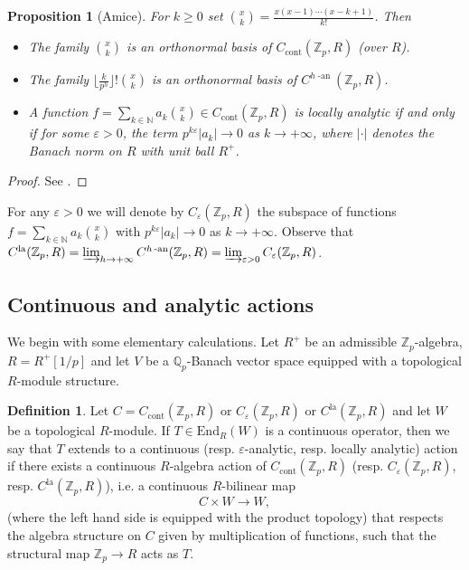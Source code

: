 \documentclass[10pt, oneside]{amsart}
\numberwithin{equation}{subsection}
\newtheorem{prop}[equation]{Proposition}
\theoremstyle{definition}
\newtheorem{definition}[equation]{Definition}
\theoremstyle{remark}
\newcommand{\mbb}[1]{\mathbb{#1}}
\newcommand{\opn}[1]{\operatorname{#1}}
\def\Q{\mathbb{Q}}
\def\Z{{\mathbb{Z}}}
\def\N{{\mathbb{N}}}
\def\zp{{\Z_p}}
\def\qp{{\Q_p}}
\def\epsilon{\varepsilon}
\begin{document}
\begin{prop}[Amice] \label{PropAmice} For $k \geq 0$ set $\binom{x}{k} = \frac{x(x-1)\cdots(x-k+1)}{k!}$. Then
\begin{itemize}
    \item The family $\binom{x}{k}$ is an orthonormal basis of $C_{\opn{cont}}(\zp, R)$ (over $R$).
    \item The family $\lfloor \frac{k}{p^h} \rfloor ! \binom{x}{k}$ is an orthonormal basis of $C^{h\opn{-an}}(\zp, R)$.
    \item A function $f = \sum_{k \in \N} a_k \binom{x}{k} \in C_{\opn{cont}}(\mbb{Z}_p, R)$ is locally analytic if and only if for some $\varepsilon > 0$, the term $p^{k \varepsilon} |a_k| \to 0$ as $k \to + \infty$, where $|\cdot |$ denotes the Banach norm on $R$ with unit ball $R^+$.
\end{itemize}
\end{prop}

\begin{proof}
See \cite[Corolaire I.2.4, Théorème I.4.7, Corolaire I.4.8]{ColmezFonctions}.
\end{proof}

For any $\varepsilon > 0$ we will denote by $C_\varepsilon(\mbb{Z}_p, R)$ the subspace of functions $f = \sum_{k \in \N} a_k \binom{x}{k}$ with $p^{k \varepsilon} |a_k| \to 0$ as $k \to +\infty$. Observe that $C^{\opn{la}}(\zp, R) = \varinjlim_{h \to +\infty} C^{h\opn{-an}}(\zp, R) = \varinjlim_{\varepsilon > 0} C_\varepsilon(\zp, R)$.

\subsection{Continuous and analytic actions} \label{SecContAndAnalytic}

We begin with some elementary calculations. Let $R^+$ be an admissible $\Z_p$-algebra, $R = R^+[1/p]$ and let $V$ be a $\qp$-Banach vector space equipped with a topological $R$-module structure.

\begin{definition} \label{DefAmice}
Let $C = C_{\opn{cont}}(\zp, R)$ or $C_\epsilon(\zp, R)$ or $C^{\opn{la}}(\zp, R)$ and let $W$ be a topological $R$-module. If $T \in \mathrm{End}_R(W)$ is a continuous operator, then we say that $T$ extends to a continuous (resp. $\epsilon$-analytic, resp. locally analytic) action if there exists a continuous $R$-algebra action of $C_{\opn{cont}}(\zp, R)$ (resp. $C_\epsilon(\mbb{Z}_p, R)$, resp. $C^{\opn{la}}(\zp, R)$), i.e. a continuous $R$-bilinear map
\[ C \times W \to W, \]
(where the left hand side is equipped with the product topology) that respects the algebra structure on $C$ given by multiplication of functions, such that the structural map $\zp \to R$ acts as $T$.
\end{definition}
\end{document}
